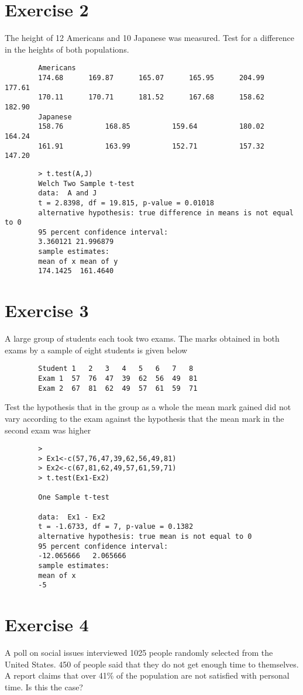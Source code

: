 \documentclass[a4paper,12pt]{article}
\begin{document}
\begin{itemize}
\begin{itemize}
\begin{verbatim}
		\end{verbatim}
		\section{Exercise 2} 
		The height of 12 Americans and 10 Japanese was measured. Test for a difference in the heights of both populations.
		\begin{verbatim}
		Americans
		174.68   	169.87 	   	165.07    	165.95 		204.99 		177.61 	
		170.11 	 	170.71 	   	181.52 		167.68 		158.62 		182.90
		Japanese
		158.76  		168.85  		159.64  		180.02  		164.24
		161.91  		163.99  		152.71  		157.32  		147.20
		\end{verbatim}
		\begin{verbatim}
		> t.test(A,J)
		Welch Two Sample t-test
		data:  A and J
		t = 2.8398, df = 19.815, p-value = 0.01018
		alternative hypothesis: true difference in means is not equal to 0
		95 percent confidence interval:
		3.360121 21.996879
		sample estimates:
		mean of x mean of y
		174.1425  161.4640
		\end{verbatim}
		
		\section{Exercise 3}
		
		A large group of students each took two exams. The marks obtained in both exams by a sample of eight students is given below
		
		\begin{verbatim}
		Student	1	2	3	4	5	6	7	8
		Exam 1	57	76	47	39	62	56	49	81
		Exam 2	67	81	62	49	57	61	59	71
		\end{verbatim}
		Test the hypothesis that in the group as a whole the mean mark gained did not vary according to the exam against the hypothesis that the mean mark in the second exam was higher
		\begin{verbatim}
		>
		> Ex1<-c(57,76,47,39,62,56,49,81)
		> Ex2<-c(67,81,62,49,57,61,59,71)
		> t.test(Ex1-Ex2)
		
		One Sample t-test
		
		data:  Ex1 - Ex2
		t = -1.6733, df = 7, p-value = 0.1382
		alternative hypothesis: true mean is not equal to 0
		95 percent confidence interval:
		-12.065666   2.065666
		sample estimates:
		mean of x
		-5
		\end{verbatim}
		
		\section{Exercise 4}
		A poll on social issues interviewed 1025 people randomly selected from the United States. 450 of people said that they do not get enough time to themselves. A report claims that over 41\% of the population are not satisfied with personal time. Is this the case?
		

\end{itemize}
\end{itemize}
\end{document}
